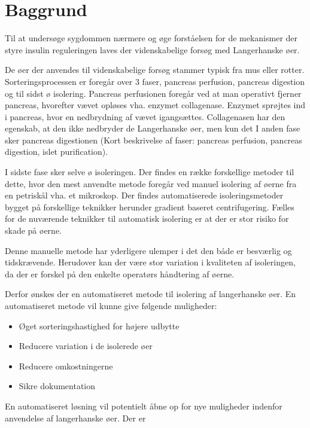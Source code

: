 \section{Baggrund}
Til at undersøge sygdommen nærmere og øge forståelsen for de mekanismer der styre insulin reguleringen laves der videnskabelige forsøg med Langerhanske øer.

De øer der anvendes til videnskabelige forsøg stammer typisk fra mus eller rotter. Sorteringsprocessen er foregår over 3 faser, pancreas perfusion, pancreas digestion og til sidst ø isolering. Pancreas perfusionen foregår ved at man operativt fjerner pancreas, hvorefter vævet opløses vha. enzymet collagenase. Enzymet sprøjtes ind i pancreas, hvor en nedbrydning af vævet igangsættes. Collagenasen har den egenskab, at den ikke nedbryder de Langerhanske øer, men kun det  I anden fase sker pancreas digestionen  (Kort beskrivelse af faser: pancreas perfusion, pancreas digestion, islet purification).

I sidste fase sker selve ø isoleringen. Der findes en række forskellige metoder til dette, hvor den mest anvendte metode foregår ved manuel isolering af øerne fra en petriskål vha. et mikroskop. Der findes automatiserede isoleringsmetoder bygget på forskellige teknikker herunder gradient baseret centrifugering. Fælles for de nuværende teknikker til automatisk isolering er at der er stor risiko for skade på øerne.

Denne manuelle metode har yderligere ulemper i det den både er besværlig og tidskrævende. Herudover kan der være stor variation i kvaliteten af isoleringen, da der er forskel på den enkelte operatørs håndtering af øerne. 

Derfor ønskes der en automatiseret metode til isolering af langerhanske øer. En automatiseret metode vil kunne give følgende muligheder: 

\begin{itemize}
\item Øget sorteringshastighed for højere udbytte
\item Reducere variation i de isolerede øer
\item Reducere omkostningerne
\item Sikre dokumentation
\end{itemize} 

En automatiseret løsning vil potentielt åbne op for nye muligheder indenfor anvendelse af langerhanske øer. Der er 


